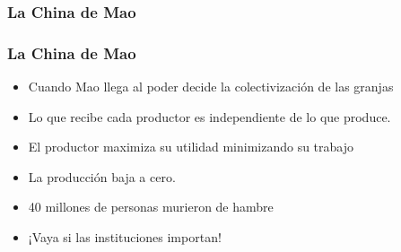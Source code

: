 \documentclass{beamer}
\begin{document}
\begin{frame}
\frametitle{La China de Mao}
\begin{center}
\begin{figure}[H]
\renewcommand{\figurename}{Figure}
\begin{center}
\end{center}
\label{fig:C11.15}
\end{figure}
\end{center}
\end{frame}

\begin{frame}
\frametitle{La China de Mao }
\begin{itemize}
    \item Cuando Mao llega al poder decide la colectivización de las granjas
    \item Lo que recibe cada productor es independiente de lo que produce. 
    
    \item El productor maximiza su utilidad minimizando su trabajo 
     \item La producción baja a cero.  
     \item 40 millones de personas murieron de hambre
     \item ¡Vaya si las instituciones importan! 
\end{itemize}

\end{frame}
\end{document}
